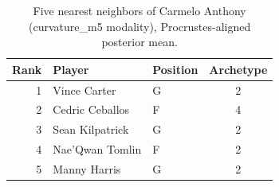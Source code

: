 \begin{table}[htbp]
  \centering\small
  \begin{tabular}{rllc}
    \toprule
    Rank & Player & Position & Archetype \\
    \midrule
    1 & Vince Carter & G & 2 \\
    2 & Cedric Ceballos & F & 4 \\
    3 & Sean Kilpatrick & G & 2 \\
    4 & Nae'Qwan Tomlin & F & 2 \\
    5 & Manny Harris & G & 2 \\
    \bottomrule
  \end{tabular}
  \caption{Five nearest neighbors of Carmelo Anthony (curvature_m5 modality), Procrustes-aligned posterior mean.}
  \label{tab:Carmelo_Anthony_neighbors_curvature_m5}
\end{table}

